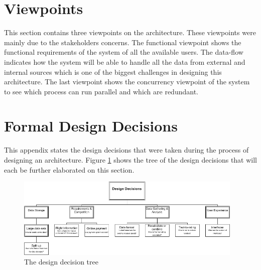 \documentclass{article}
\begin{document}


\section{Viewpoints}
 
This section contains three viewpoints on the architecture. These viewpoints were mainly due to the stakeholders concerns. The functional viewpoint shows the functional requirements of the system of all the available users. The data-flow indicates how the system will be able to handle all the data from external and internal sources which is one of the biggest challenges in designing this architecture. The last viewpoint shows the concurrency viewpoint of the system to see which process can run parallel and which are redundant.


%



\appendix



\clearpage
\section{Formal Design Decisions}
This appendix states the design decisions that were taken during the process of designing an architecture. Figure \ref{fig:ddtree} shows the tree of the design decisions that will each be further elaborated on this section.

\begin{figure}[!ht]
\includegraphics[width= 410px]{DDTree}
\caption{The design decision tree}
\label{fig:ddtree}
\end{figure}

\setcounter{table}{0}

\clearpage

\newpage

%
\newpage

%
\newpage

\newpage

\newpage

\newpage

\newpage

\newpage

\newpage

\end{document}
